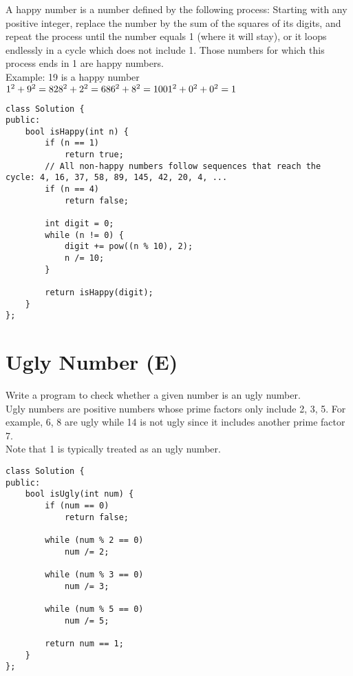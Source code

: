 A happy number is a number defined by the following process: Starting with any positive integer, replace the number by the sum of the squares of its digits, and repeat the process until the number equals 1 (where it will stay), or it loops endlessly in a cycle which does not include 1. Those numbers for which this process ends in 1 are happy numbers.\\

Example: 19 is a happy number\\

    $1^2 + 9^2 = 82\\
    8^2 + 2^2 = 68\\
    6^2 + 8^2 = 100\\
    1^2 + 0^2 + 0^2 = 1$\\
    
\begin{lstlisting}
class Solution {
public:
    bool isHappy(int n) {
        if (n == 1) 
            return true;
        // All non-happy numbers follow sequences that reach the cycle: 4, 16, 37, 58, 89, 145, 42, 20, 4, ... 
        if (n == 4)         
            return false;

        int digit = 0;
        while (n != 0) {
            digit += pow((n % 10), 2);
            n /= 10;
        }
        
        return isHappy(digit);
    }
};
\end{lstlisting}


\section{Ugly Number (E)}
Write a program to check whether a given number is an ugly number.\\

Ugly numbers are positive numbers whose prime factors only include 2, 3, 5. For example, 6, 8 are ugly while 14 is not ugly since it includes another prime factor 7.\\

Note that 1 is typically treated as an ugly number. \\

\begin{lstlisting}
class Solution {
public:
    bool isUgly(int num) {
        if (num == 0)
            return false;
        
        while (num % 2 == 0)
            num /= 2;
        
        while (num % 3 == 0)
            num /= 3;
        
        while (num % 5 == 0)
            num /= 5;
        
        return num == 1;
    }
};
\end{lstlisting}


